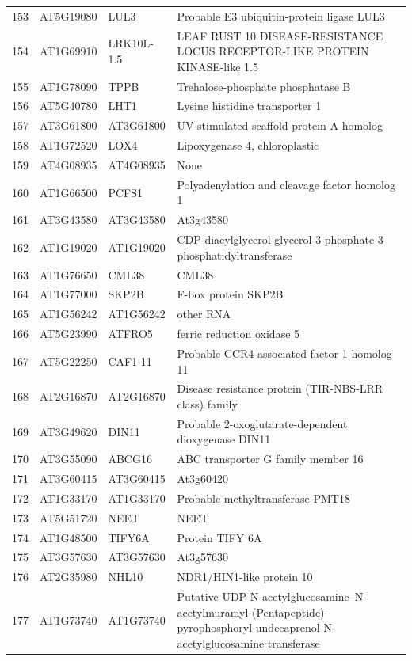 \documentclass[11pt]{article}
\begin{document}
\begin{center}
\begin{tabular}{rlll}
153 & AT5G19080 & LUL3 & Probable E3 ubiquitin-protein ligase LUL3\\
154 & AT1G69910 & LRK10L-1.5 & LEAF RUST 10 DISEASE-RESISTANCE LOCUS RECEPTOR-LIKE PROTEIN KINASE-like 1.5\\
155 & AT1G78090 & TPPB & Trehalose-phosphate phosphatase B\\
156 & AT5G40780 & LHT1 & Lysine histidine transporter 1\\
157 & AT3G61800 & AT3G61800 & UV-stimulated scaffold protein A homolog\\
158 & AT1G72520 & LOX4 & Lipoxygenase 4, chloroplastic\\
159 & AT4G08935 & AT4G08935 & None\\
160 & AT1G66500 & PCFS1 & Polyadenylation and cleavage factor homolog 1\\
161 & AT3G43580 & AT3G43580 & At3g43580\\
162 & AT1G19020 & AT1G19020 & CDP-diacylglycerol-glycerol-3-phosphate 3-phosphatidyltransferase\\
163 & AT1G76650 & CML38 & CML38\\
164 & AT1G77000 & SKP2B & F-box protein SKP2B\\
165 & AT1G56242 & AT1G56242 & other RNA\\
166 & AT5G23990 & ATFRO5 & ferric reduction oxidase 5\\
167 & AT5G22250 & CAF1-11 & Probable CCR4-associated factor 1 homolog 11\\
168 & AT2G16870 & AT2G16870 & Disease resistance protein (TIR-NBS-LRR class) family\\
169 & AT3G49620 & DIN11 & Probable 2-oxoglutarate-dependent dioxygenase DIN11\\
170 & AT3G55090 & ABCG16 & ABC transporter G family member 16\\
171 & AT3G60415 & AT3G60415 & At3g60420\\
172 & AT1G33170 & AT1G33170 & Probable methyltransferase PMT18\\
173 & AT5G51720 & NEET & NEET\\
174 & AT1G48500 & TIFY6A & Protein TIFY 6A\\
175 & AT3G57630 & AT3G57630 & At3g57630\\
176 & AT2G35980 & NHL10 & NDR1/HIN1-like protein 10\\
177 & AT1G73740 & AT1G73740 & Putative UDP-N-acetylglucosamine--N-acetylmuramyl-(Pentapeptide)-pyrophosphoryl-undecaprenol N-acetylglucosamine transferase\\

\end{tabular}
\end{center}
\end{document}
